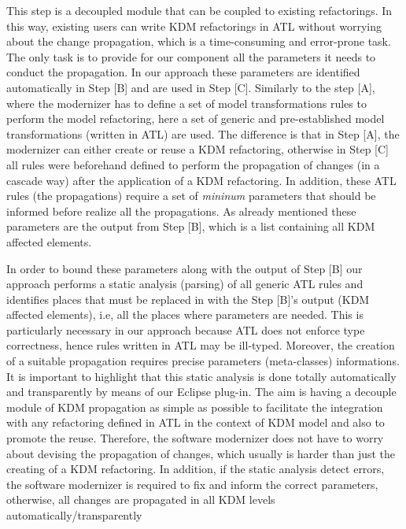 This step is a decoupled module that can be coupled to existing refactorings. In this way, existing users can write KDM refactorings in ATL without worrying about the change propagation, which is a time-consuming and error-prone task. The only task is to provide for our component all the parameters it needs to conduct the propagation. In our approach these parameters are identified automatically in Step [B] and are used in Step [C]. 
%
%
Similarly to the step [A], where the modernizer has to define a set of model transformations rules to perform the model refactoring, here a set of generic and pre-established model transformations (written in ATL) are used. The difference is that in Step [A], the modernizer can either create or reuse a KDM refactoring, otherwise in Step [C] all rules were beforehand defined to perform the propagation of changes (in a cascade way) after the application of a KDM refactoring. In addition, these ATL rules (the propagations) require a set of  \textit{mininum} parameters that should be informed before realize all the propagations. As already mentioned these parameters are the output from Step [B], which is a list containing all KDM affected elements. 

In order to bound these parameters along with the output of Step [B] our approach performs a static analysis (parsing) of all generic ATL rules and identifies places that must be replaced in with the Step [B]'s output (KDM affected elements), i.e, all the places where parameters are needed. This is particularly necessary in our approach because ATL does not enforce type correctness, hence rules written in ATL may be ill-typed. Moreover, the creation of a suitable propagation %
requires precise parameters (meta-classes) informations. It is important to highlight that this static analysis is done totally automatically and transparently by means of our Eclipse plug-in. The aim is having a decouple module of KDM propagation as simple as possible to facilitate the integration with any refactoring defined in ATL in the context of KDM model and also to promote the reuse. Therefore, the software modernizer does not have to worry about devising the propagation of changes, which usually is harder than just the creating of a KDM refactoring. 
%
In addition, if the static analysis detect errors, the software modernizer is required to fix and inform the correct parameters, otherwise, all changes are propagated in all KDM levels automatically/transparently  



